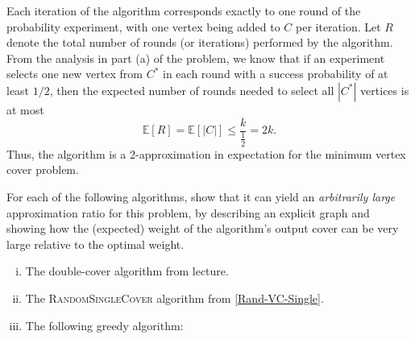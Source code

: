 \documentclass[12pt, letterpaper]{article}
\begin{document}
\begin{problemproof}
  Each iteration of the algorithm corresponds exactly to one round of the probability experiment, with one vertex being added to \(C\) per iteration. Let \(R\) denote the total number of rounds (or iterations) performed by the algorithm. From the analysis in part (a) of the problem, we know that if an experiment selects one new vertex from \(C^*\) in each round with a success probability of at least \(1/2\), then the expected number of rounds needed to select all \(|C^*|\) vertices is at most
  \[
  \mathbb{E}[R]=\mathbb{E}[|C|] \le \frac{k}{\frac{1}{2}} = 2k.
  \]
  Thus, the algorithm is a 2-approximation in expectation for the minimum vertex cover problem.
\end{problemproof}

\begin{subproblem}{}
  For each of the following algorithms, show that it can yield an \emph{arbitrarily large} approximation ratio for this problem, by describing an explicit graph and showing how the (expected) weight of the algorithm's output cover can be very large relative to the optimal weight.
    \begin{enumerate}[(i)]
    \item The double-cover algorithm from lecture.
    \item The \textsc{RandomSingleCover} algorithm from \cref{Rand-VC-Single}.
    \item The following greedy algorithm:
    \end{enumerate}
    \begin{minipage}{\linewidth}
      \begin{algorithm}[H]
        \begin{algorithmic}[1]
          \EndWhile
          \EndFunction
        \end{algorithmic}
      \end{algorithm}
    \end{minipage}
\end{subproblem}
\end{document}
